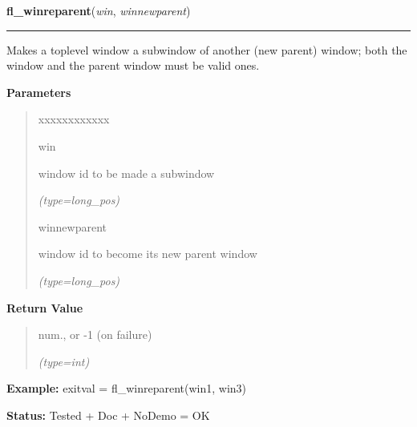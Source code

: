 \hspace{.8\funcindent}\begin{boxedminipage}{\funcwidth}

    \raggedright \textbf{fl\_winreparent}(\textit{win}, \textit{winnewparent})

    \vspace{-1.5ex}

    \rule{\textwidth}{0.5\fboxrule}
\setlength{\parskip}{2ex}
    Makes a toplevel window a subwindow of another (new parent) window; 
    both the window and the parent window must be valid ones.

\setlength{\parskip}{1ex}
      \textbf{Parameters}
      \vspace{-1ex}

      \begin{quote}
        \begin{Ventry}{xxxxxxxxxxxx}

          \item[win]

          window id to be made a subwindow

            {\it (type=long\_pos)}

          \item[winnewparent]

          window id to become its new parent window

            {\it (type=long\_pos)}

        \end{Ventry}

      \end{quote}

      \textbf{Return Value}
    \vspace{-1ex}

      \begin{quote}
      num., or -1 (on failure)

      {\it (type=int)}

      \end{quote}

\textbf{Example:} exitval = fl\_winreparent(win1, win3)



\textbf{Status:} Tested + Doc + NoDemo = OK



    \end{boxedminipage}

    \label{xformslib:flxbasic:fl_winfocus}


